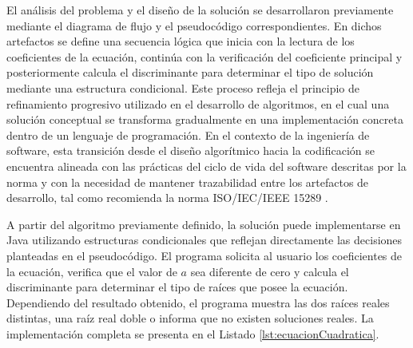 \documentclass[12pt,twoside]{book}
\begin{document}
					El análisis del problema y el diseño de la solución se desarrollaron previamente mediante el diagrama de flujo y el pseudocódigo correspondientes. En dichos artefactos se define una secuencia lógica que inicia con la lectura de los coeficientes de la ecuación, continúa con la verificación del coeficiente principal y posteriormente calcula el discriminante para determinar el tipo de solución mediante una estructura condicional. Este proceso refleja el principio de refinamiento progresivo utilizado en el desarrollo de algoritmos, en el cual una solución conceptual se transforma gradualmente en una implementación concreta dentro de un lenguaje de programación. En el contexto de la ingeniería de software, esta transición desde el diseño algorítmico hacia la codificación se encuentra alineada con las prácticas del ciclo de vida del software descritas por la norma \cite{ISOIECIEEE2017SoftwareLifeCycle} y con la necesidad de mantener trazabilidad entre los artefactos de desarrollo, tal como recomienda la norma ISO/IEC/IEEE 15289 \cite{ISOIECIEEE2019SystemSoftwareEngineering}.
					
					A partir del algoritmo previamente definido, la solución puede implementarse en Java utilizando estructuras condicionales que reflejan directamente las decisiones planteadas en el pseudocódigo. El programa solicita al usuario los coeficientes de la ecuación, verifica que el valor de \(a\) sea diferente de cero y calcula el discriminante para determinar el tipo de raíces que posee la ecuación. Dependiendo del resultado obtenido, el programa muestra las dos raíces reales distintas, una raíz real doble o informa que no existen soluciones reales. La implementación completa se presenta en el Listado \ref{lst:ecuacionCuadratica}.
					
\end{document}
